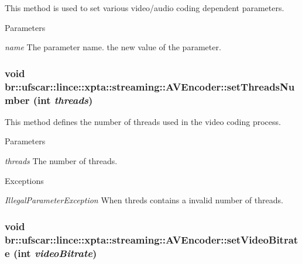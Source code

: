 This method is used to set various video/audio coding dependent parameters. 


\begin{DoxyParams}{Parameters}
\item[{\em name}]The parameter name.  the new value of the parameter. \end{DoxyParams}
\hypertarget{classbr_1_1ufscar_1_1lince_1_1xpta_1_1streaming_1_1AVEncoder_ae4bbdcbc13bf874954d3087dda55080e}{
\subsubsection[{setThreadsNumber}]{\setlength{\rightskip}{0pt plus 5cm}void br::ufscar::lince::xpta::streaming::AVEncoder::setThreadsNumber (int {\em threads})}}
\label{classbr_1_1ufscar_1_1lince_1_1xpta_1_1streaming_1_1AVEncoder_ae4bbdcbc13bf874954d3087dda55080e}


This method defines the number of threads used in the video coding process. 


\begin{DoxyParams}{Parameters}
\item[{\em threads}]The number of threads. \end{DoxyParams}

\begin{DoxyExceptions}{Exceptions}
\item[{\em IllegalParameterException}]When threds contains a invalid number of threads. \end{DoxyExceptions}
\hypertarget{classbr_1_1ufscar_1_1lince_1_1xpta_1_1streaming_1_1AVEncoder_ab39d36dc72ceb6663da453afcfad5d0e}{
\subsubsection[{setVideoBitrate}]{\setlength{\rightskip}{0pt plus 5cm}void br::ufscar::lince::xpta::streaming::AVEncoder::setVideoBitrate (int {\em videoBitrate})}}
\label{classbr_1_1ufscar_1_1lince_1_1xpta_1_1streaming_1_1AVEncoder_ab39d36dc72ceb6663da453afcfad5d0e}


